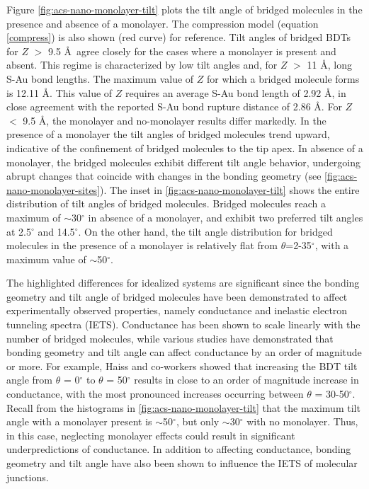 \documentclass[10pt]{report}  %
\newcommand{\degree}{\ensuremath{^\circ}}
\begin{document}
Figure \ref{fig:acs-nano-monolayer-tilt} plots the tilt angle of bridged molecules in the presence and absence of a monolayer.  The compression model (equation \ref{compress}) is also shown (red curve) for reference. Tilt angles of bridged BDTs for $Z$ $>$ 9.5 \AA\ agree closely for the cases where a monolayer is present and absent.  This regime is characterized by low tilt angles and, for $Z$ $>$ 11 \AA, long S-Au bond lengths.  The maximum value of $Z$ for which a bridged molecule forms is 12.11 \AA.  This value of $Z$ requires an average S-Au bond length of 2.92 \AA, in close agreement with the reported S-Au bond rupture distance of 2.86 \AA. \cite{Pontes:2011}  For $Z$ $<$ 9.5 \AA, the monolayer and no-monolayer results differ markedly.  In the presence of a monolayer the tilt angles of bridged molecules trend upward, indicative of the confinement of bridged molecules to the tip apex.  In absence of a monolayer, the bridged molecules exhibit different tilt angle behavior, undergoing abrupt changes that coincide with changes in the bonding geometry (see \ref{fig:acs-nano-monolayer-sites}).  The inset in \ref{fig:acs-nano-monolayer-tilt} shows the entire distribution of tilt angles of bridged molecules.  Bridged molecules reach a maximum of $\sim$30$\degree$ in absence of a monolayer, and exhibit two preferred tilt angles at 2.5$\degree$ and 14.5$\degree$. On the other hand, the tilt angle distribution for bridged molecules in the presence of a monolayer is relatively flat from $\theta$=2-35$\degree$, with a maximum value of $\sim$50$\degree$.

The highlighted differences for idealized systems are significant since the bonding geometry and tilt angle of bridged molecules have been demonstrated to affect experimentally observed properties, namely conductance and inelastic electron tunneling spectra (IETS).  Conductance has been shown to scale linearly with the number of bridged molecules\cite{Kushmerick:2003}, while various studies \cite{Bratkovsky:2003,Tsutsui:2006,Haiss:2008,Kim:2011} have demonstrated that bonding geometry and tilt angle can affect conductance by an order of magnitude or more. For example, Haiss and co-workers \cite{Haiss:2008} showed that increasing the BDT tilt angle from $\theta$ = 0$\degree$ to $\theta$ = 50$\degree$ results in close to an order of magnitude increase in conductance, with the most pronounced increases occurring between $\theta$ = 30-50$\degree$.  Recall from the histograms in \ref{fig:acs-nano-monolayer-tilt} that the maximum tilt angle with a monolayer present is $\sim$50$\degree$, but only $\sim$30$\degree$ with no monolayer.  Thus, in this case, neglecting monolayer effects could result in significant underpredictions of conductance.  In addition to affecting conductance, bonding geometry and tilt angle have also been shown to influence the IETS of molecular junctions. \cite{Lin:2011}
\end{document}
